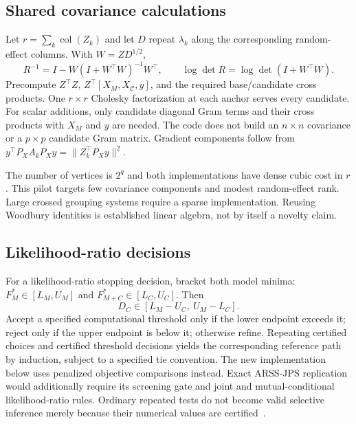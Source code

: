 \documentclass[11pt,a4paper]{article}
\theoremstyle{remark}\newtheorem{remark}[theorem]{Remark}
\newcommand{\calC}{\mathcal C}
\begin{document}
\subsection{Shared covariance calculations}
Let $r=\sum_k\operatorname{col}(Z_k)$ and let $D$ repeat $\lambda_k$ along the
corresponding random-effect columns. With $W=ZD^{1/2}$,
\begin{equation}
R^{-1}=I-W(I+W^\top W)^{-1}W^\top,
\qquad \log\det R=\log\det(I+W^\top W).
\end{equation}
Precompute $Z^\top Z$, $Z^\top[X_M,X_{\calC},y]$, and the required base/candidate
cross products. One $r\times r$ Cholesky factorization at each anchor serves every
candidate. For scalar additions, only candidate diagonal Gram terms and their
cross products with $X_M$ and $y$ are needed. The code does not build an $n\times n$
covariance or a $p\times p$ candidate Gram matrix. Gradient components follow from
$y^\top P_XA_kP_Xy=\|Z_k^\top P_Xy\|^2$.

The number of vertices is $2^q$ and both implementations have dense cubic
cost in $r$. This pilot targets few covariance components and modest random-effect
rank. Large crossed grouping systems require a sparse implementation. Reusing
Woodbury identities is established linear algebra, not by itself a novelty claim.

\subsection{Likelihood-ratio decisions}
For a likelihood-ratio stopping decision, bracket both model minima:
$F_M^*\in[L_M,U_M]$ and $F_{M+C}^*\in[L_C,U_C]$. Then
\begin{equation}\label{eq:stop}
D_C\in[L_M-U_C,\ U_M-L_C].
\end{equation}
Accept a specified computational threshold only if the lower endpoint exceeds it;
reject only if the upper endpoint is below it; otherwise refine. Repeating
certified choices and certified threshold decisions yields the corresponding
reference path by induction, subject to a specified tie convention. The new
implementation below uses penalized objective comparisons instead. Exact
ARSS-JPS replication would additionally require its screening gate and joint and
mutual-conditional likelihood-ratio rules. Ordinary repeated tests do not become
valid selective inference merely because their numerical values are
certified~\cite{rugamer}.
\end{document}
